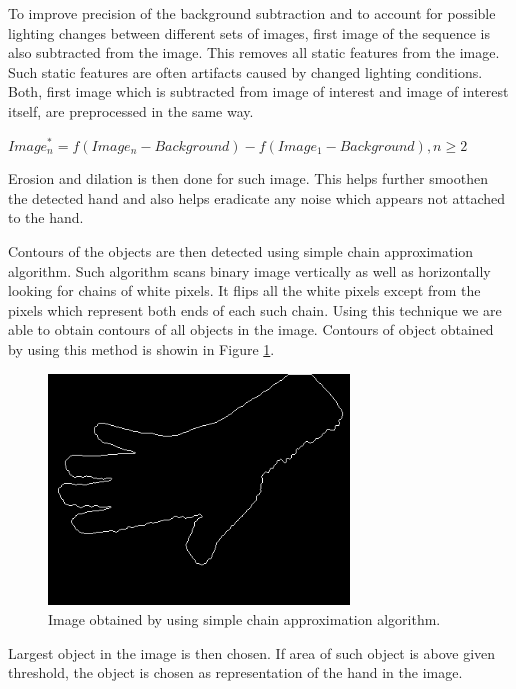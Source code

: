 To improve precision of the background subtraction and to account for possible lighting changes between different sets of images, first image of the sequence is also subtracted from the image. This removes all static features from the image. Such static features are often artifacts caused by changed lighting conditions. Both, first image which is subtracted from image of interest and image of interest itself, are preprocessed in the same way.

\begin{math}
Image^*_n = f(Image_n - Background) - f(Image_1 - Background), n \geq 2
\end{math}

Erosion and dilation is then done for such image. This helps further smoothen the detected hand and also helps eradicate any noise which appears not attached to the hand.

Contours of the objects are then detected using simple chain approximation algorithm. Such algorithm scans binary image vertically as well as horizontally looking for chains of white pixels. It flips all the white pixels except from the pixels which represent both ends of each such chain. Using this technique we are able to obtain contours of all objects in the image. Contours of object obtained by using this method is showin in Figure \ref{fig:contours}.

\begin{figure}
\begin{center}
\includegraphics[width=80mm]{contours.png}
\caption{Image obtained by using simple chain approximation algorithm.}
\label{fig:contours}
\end{center}
\end{figure}

Largest object in the image is then chosen. If area of such object is above given threshold, the object is chosen as representation of the hand in the image.